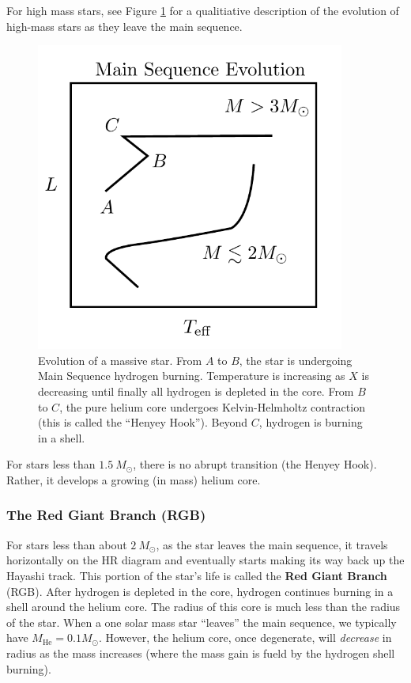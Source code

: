 \documentclass[10pt]{article}
\numberwithin{equation}{section}
\newcommand{\n}{\noindent}
\newcommand{\figref}[1]{Figure \ref{#1}}
\begin{document}
    For high mass stars, see \figref{fig:2} for a qualitiative
    description of the evolution of high-mass stars as they leave the
    main sequence. \\
    \begin{figure}[h!]
      \centering
      \includegraphics[width = 4in]{MSDiagram.pdf}
      \caption{Evolution of a massive star. From $A$ to $B$, the star
        is undergoing Main Sequence hydrogen burning. Temperature is
        increasing as $X$ is decreasing until finally all hydrogen is
        depleted in the core. From $B$ to $C$, the pure helium core
        undergoes Kelvin-Helmholtz contraction (this is called the
        ``Henyey Hook''). Beyond $C$, hydrogen is burning in a shell.}
      \label{fig:2}
    \end{figure}

    \n For stars less than $1.5\ M_\odot$, there is no abrupt transition
    (the Henyey Hook). Rather, it develops a growing (in mass) helium
    core. 

    \subsubsection{The Red Giant Branch (RGB)}
    \label{sec:red-giant-branch}

    For stars less than about $2\ M_\odot$, as the star leaves the
    main sequence, it travels horizontally on the HR diagram and
    eventually starts making its way back up the Hayashi track. This
    portion of the star's life is called the \textbf{Red Giant Branch}
    (RGB). After hydrogen is depleted in the core, hydrogen continues
    burning in a shell around the helium core. The radius of this core
    is much less than the radius of the star. When a one solar mass
    star ``leaves'' the main sequence, we typically have
    $M_{\mathrm{He}}=0.1 M_\odot$. However, the helium core, once
    degenerate, will \emph{decrease} in radius as the mass increases
    (where the mass gain is fueld by the hydrogen shell burning).\\
    
\end{document}

